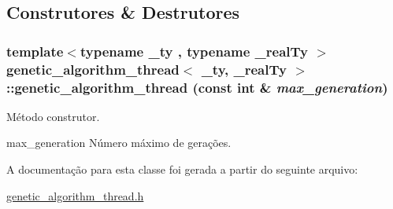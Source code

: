 \subsection{Construtores \& Destrutores}
\hypertarget{classgenetic__algorithm__thread_aa09321fa64467ad8dbe34d809eb786da}{
\subsubsection[{genetic\_\-algorithm\_\-thread}]{\setlength{\rightskip}{0pt plus 5cm}template$<$typename \_\-ty , typename \_\-realTy $>$ {\bf genetic\_\-algorithm\_\-thread}$<$ \_\-ty, \_\-realTy $>$::{\bf genetic\_\-algorithm\_\-thread} (const int \& {\em max\_\-generation})}}
\label{classgenetic__algorithm__thread_aa09321fa64467ad8dbe34d809eb786da}
Método construtor.

max\_\-generation Número máximo de gerações. 

A documentação para esta classe foi gerada a partir do seguinte arquivo:\begin{DoxyCompactItemize}
\item 
\hyperlink{genetic__algorithm__thread_8h}{genetic\_\-algorithm\_\-thread.h}\end{DoxyCompactItemize}
